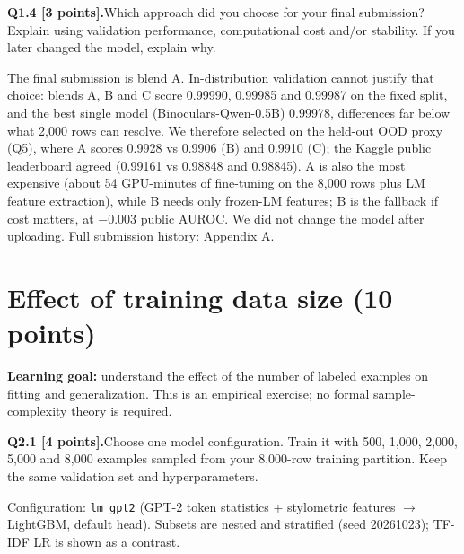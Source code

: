 \documentclass[11pt,letterpaper]{article}
\newcommand{\question}[2]{\needspace{4\baselineskip}\par\addvspace{0.45em}\noindent\textbf{#1}\quad #2\par\nobreak\vspace{0.1em}}
\begin{document}
\question{Q1.4 [3 points].}{Which approach did you choose for your final submission? Explain using validation performance, computational cost and/or stability. If you later changed the model, explain why.}
The final submission is blend A. In-distribution validation cannot justify that choice: blends A, B and C score 0.99990, 0.99985 and 0.99987 on the fixed split, and the best single model (Binoculars-Qwen-0.5B) 0.99978, differences far below what 2,000 rows can resolve. We therefore selected on the held-out OOD proxy (Q5), where A scores 0.9928 vs 0.9906 (B) and 0.9910 (C); the Kaggle public leaderboard agreed (0.99161 vs 0.98848 and 0.98845). A is also the most expensive (about 54 GPU-minutes of fine-tuning on the 8,000 rows plus LM feature extraction), while B needs only frozen-LM features; B is the fallback if cost matters, at $-0.003$ public AUROC. We did not change the model after uploading. Full submission history: Appendix A.

\section{Effect of training data size (10 points)}
\textbf{Learning goal:} understand the effect of the number of labeled examples on fitting and generalization. This is an empirical exercise; no formal sample-complexity theory is required.

\question{Q2.1 [4 points].}{Choose one model configuration. Train it with 500, 1,000, 2,000, 5,000 and 8,000 examples sampled from your 8,000-row training partition. Keep the same validation set and hyperparameters.}
Configuration: \texttt{lm\_gpt2} (GPT-2 token statistics + stylometric features $\to$ LightGBM, default head). Subsets are nested and stratified (seed 20261023); TF-IDF LR is shown as a contrast.
\end{document}
